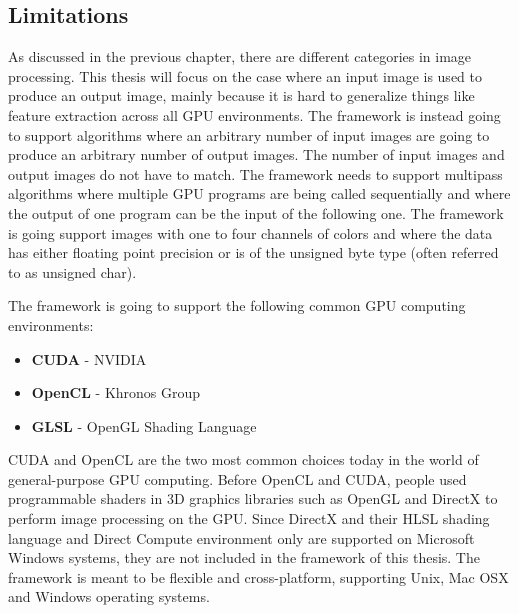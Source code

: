 \subsection{Limitations}

As discussed in the previous chapter, there are different categories in image processing. This thesis will focus on the case where an input image is used to produce an output image, mainly because it is hard to generalize things like feature extraction across all GPU environments. The framework is instead going to support algorithms where an arbitrary number of input images are going to produce an arbitrary number of output images. The number of input images and output images do not have to match. The framework needs to support multipass algorithms where multiple GPU programs are being called sequentially and where the output of one program can be the input of the following one. The framework is going support images with one to four channels of colors and where the data has either floating point precision or is of the unsigned byte type (often referred to as unsigned char).
\newline

The framework is going to support the following common GPU computing environments:

\begin{itemize}
\item{{\bf CUDA} - NVIDIA}
\item{{\bf OpenCL} - Khronos Group}
\item{{\bf GLSL} - OpenGL Shading Language}
\end{itemize}

CUDA and OpenCL are the two most common choices today in the world of general-purpose GPU computing. Before OpenCL and CUDA, people used programmable shaders in 3D graphics libraries such as OpenGL and DirectX to perform image processing on the GPU. Since DirectX and their HLSL shading language and Direct Compute environment only are supported on Microsoft Windows systems, they are not included in the framework of this thesis. The framework is meant to be flexible and cross-platform, supporting Unix, Mac OSX and Windows operating systems.
